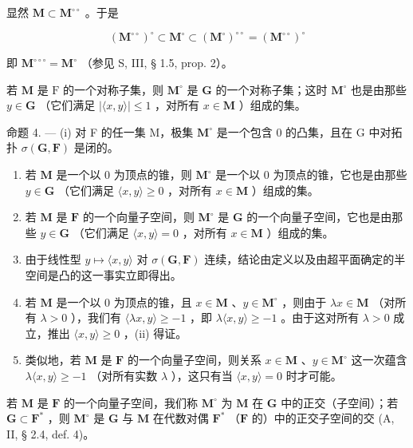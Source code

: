 显然 \(\mathbf{M} \subset \mathbf{M}^{\circ \circ}\) 。于是

\[
(\mathbf {M} ^ {\circ \circ}) ^ {\circ} \subset \mathbf {M} ^ {\circ} \subset (\mathbf {M} ^ {\circ}) ^ {\circ \circ} = (\mathbf {M} ^ {\circ \circ}) ^ {\circ}
\]

即 \(\mathbf{M}^{\circ \circ \circ} = \mathbf{M}^{\circ}\) （参见 S, III, § 1.5, prop. 2）。

若 \(\mathbf{M}\) 是 \(\mathrm{F}\) 的一个对称子集，则 \(\mathbf{M}^{\circ}\) 是 \(\mathbf{G}\) 的一个对称子集；这时 \(\mathbf{M}^{\circ}\) 也是由那些 \(y \in \mathbf{G}\) （它们满足 \(|\langle x, y \rangle| \leqslant 1\) ，对所有 \(x \in \mathbf{M}\) ）组成的集。

命题 4. --- (i) 对 F 的任一集 M，极集 \(\mathbf{M}^{\circ}\) 是一个包含 0 的凸集，且在 G 中对拓扑 \(\sigma(\mathbf{G},\mathbf{F})\) 是闭的。

\begin{enumerate}
\def\labelenumi{(\roman{enumi})}
\setcounter{enumi}{1}
\item
  若 \(\mathbf{M}\) 是一个以 0 为顶点的锥，则 \(\mathbf{M}^{\circ}\) 是一个以 0 为顶点的锥，它也是由那些 \(y\in \mathbf{G}\) （它们满足 \(\langle x,y\rangle \geqslant 0\) ，对所有 \(x\in \mathbf{M}\) ）组成的集。
\item
  若 \(\mathbf{M}\) 是 \(\mathbf{F}\) 的一个向量子空间，则 \(\mathbf{M}^{\circ}\) 是 \(\mathbf{G}\) 的一个向量子空间，它也是由那些 \(y \in \mathbf{G}\) （它们满足 \(\langle x, y \rangle = 0\) ，对所有 \(x \in \mathbf{M}\) ）组成的集。
\item
  由于线性型 \(y \mapsto \langle x, y \rangle\) 对 \(\sigma(\mathbf{G}, \mathbf{F})\) 连续，结论由定义以及由超平面确定的半空间是凸的这一事实立即得出。
\item
  若 \(\mathbf{M}\) 是一个以 0 为顶点的锥，且 \(x \in \mathbf{M}\) 、\(y \in \mathbf{M}^{\circ}\) ，则由于 \(\lambda x \in \mathbf{M}\) （对所有 \(\lambda > 0\) ），我们有 \(\langle \lambda x, y \rangle \geqslant -1\) ，即 \(\lambda \langle x, y \rangle \geqslant -1\) 。由于这对所有 \(\lambda > 0\) 成立，推出 \(\langle x, y \rangle \geqslant 0\) ，(ii) 得证。
\item
  类似地，若 \(\mathbf{M}\) 是 \(\mathbf{F}\) 的一个向量子空间，则关系 \(x \in \mathbf{M}\) 、\(y \in \mathbf{M}^{\circ}\) 这一次蕴含 \(\lambda \langle x, y \rangle \geqslant -1\) （对所有实数 \(\lambda\) ），这只有当 \(\langle x, y \rangle = 0\) 时才可能。
\end{enumerate}

若 \(\mathbf{M}\) 是 \(\mathbf{F}\) 的一个向量子空间，我们称 \(\mathbf{M}^{\circ}\) 为 \(\mathbf{M}\) 在 \(\mathbf{G}\) 中的正交（子空间）；若 \(\mathbf{G} \subset \mathbf{F}^{*}\) ，则 \(\mathbf{M}^{\circ}\) 是 \(\mathbf{G}\) 与 \(\mathbf{M}\) 在代数对偶 \(\mathbf{F}^{*}\) （\(\mathbf{F}\) 的）中的正交子空间的交 (A, II, § 2.4, def. 4)。

